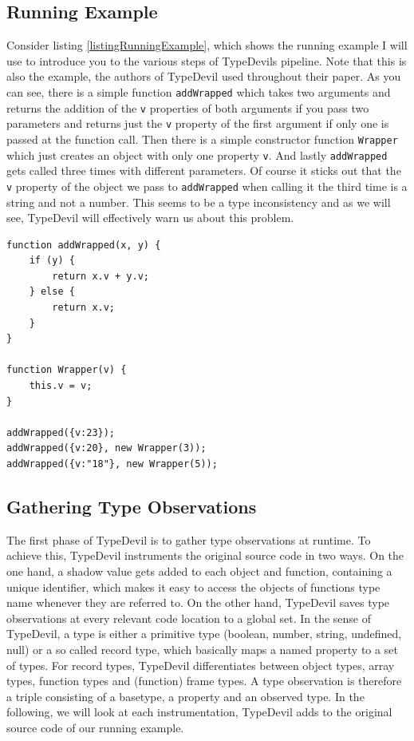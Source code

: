 \documentclass[runningheads,a4paper]{llncs}
\begin{document}
\subsection{Running Example}
Consider listing \ref{listingRunningExample}, which shows the running example I will use to introduce you to the various steps of TypeDevils pipeline.
Note that this is also the example, the authors of TypeDevil used throughout their paper.
As you can see, there is a simple function \lstinline[columns=fixed]{addWrapped} which takes two arguments and returns the addition of the \lstinline[columns=fixed]{v} properties of both arguments if you pass two parameters and returns just the \lstinline[columns=fixed]{v} property of the first argument if only one is passed at the function call.
Then there is a simple constructor function \lstinline[columns=fixed]{Wrapper} which just creates an object with only one property \lstinline[columns=fixed]{v}.
And lastly \lstinline[columns=fixed]{addWrapped} gets called three times with different parameters.
Of course it sticks out that the \lstinline[columns=fixed]{v} property of the object we pass to \lstinline[columns=fixed]{addWrapped} when calling it the third time is a string and not a number.
This seems to be a type inconsistency and as we will see, TypeDevil will effectively warn us about this problem.

\medskip\medskip
\lstset{language=javascript}
\begin{minipage}{\linewidth}
\begin{lstlisting}[frame=single, caption=Running Example, label=listingRunningExample]
function addWrapped(x, y) {
    if (y) {
        return x.v + y.v;
    } else {
        return x.v;
    }
}

function Wrapper(v) {
    this.v = v;
}

addWrapped({v:23});
addWrapped({v:20}, new Wrapper(3));
addWrapped({v:"18"}, new Wrapper(5));
\end{lstlisting}
\end{minipage}


\subsection{Gathering Type Observations}

The first phase of TypeDevil is to gather type observations at runtime.
To achieve this, TypeDevil instruments the original source code in two ways.
On the one hand, a shadow value gets added to each object and function, containing a unique identifier, which makes it easy to access the objects of functions type name whenever they are referred to. 
On the other hand, TypeDevil saves type observations at every relevant code location to a global set.
In the sense of TypeDevil, a type is either a primitive type (boolean, number, string, undefined, null) or a so called record type, which basically maps a named property to a set of types.
For record types, TypeDevil differentiates between object types, array types, function types and (function) frame types.
A type observation is therefore a triple consisting of a basetype, a property and an observed type.
In the following, we will look at each instrumentation, TypeDevil adds to the original source code of our running example.
\end{document}
